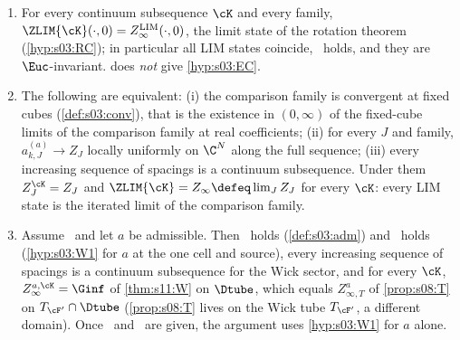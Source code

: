 \begin{proposition}[identification]\label{prop:s12:ID}
\begin{enumerate}[label=\textup{(\alph*)},leftmargin=*,nosep]
\item For every continuum subsequence $\cK$ and every family, $\ZLIM{\cK}(\cdot,0)=Z^{\mathrm{LIM}}_\infty(\cdot,0)$, the limit state of the rotation theorem (\cref{hyp:s03:RC}); in particular all LIM states coincide, \UNIQ\ holds, and they are $\Euc$-invariant.  does \emph{not} give \cref{hyp:s03:EC}.
\item The following are equivalent: (i) the comparison family is convergent at fixed cubes (\cref{def:s03:conv}), that is the existence in $(0,\infty)$ of the fixed-cube limits of the comparison family at real coefficients; (ii) for every $J$ and family, $a^{(a)}_{k,J}\to Z_J$ locally uniformly on $\C^N$ along the full sequence; (iii) every increasing sequence of spacings is a continuum subsequence. Under them $Z^{\cK}_J=Z_J$ and $\ZLIM{\cK}=Z_\infty\defeq\lim_JZ_J$ for every $\cK$: every LIM state is the iterated limit of the comparison family.
\item Assume \Tthree\ and let $a$ be admissible. Then \SCH\ holds (\cref{def:s03:adm}) and \Bcell\ holds (\cref{hyp:s03:W1} for $a$ at the one cell and source), every increasing sequence of spacings is a continuum subsequence for the Wick sector, and for every $\cK$, $Z^{a,\cK}_\infty=\Ginf$ of \cref{thm:s11:W} on $\Dtube$, which equals $Z^a_{\infty,T}$ of \cref{prop:s08:T} on $T_{\cF'}\cap\Dtube$ (\cref{prop:s08:T} lives on the Wick tube $T_{\cF'}$, a different domain). Once \SCH\ and \Bcell\ are given, the argument uses \cref{hyp:s03:W1} for $a$ alone.
\end{enumerate}
\end{proposition}

